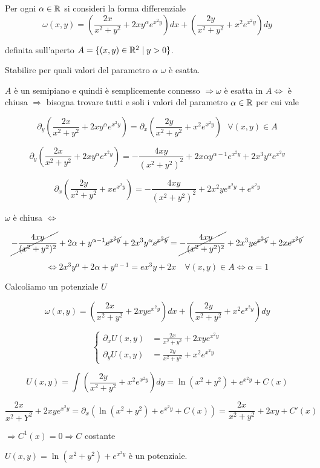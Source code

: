 	
\begin{exbar}
\begin{example}
	Per ogni $\alpha  \in \mathbb{R}$ si consideri la forma differenziale 
	\begin{equation*}
		\omega (x,y)=\left(\frac{2x}{x^2+y^2}+2xy^\alpha e^{x^2y} \right) dx + \left( \frac{2y}{x^2+y^2}+x^2e^{x^2y} \right) dy
	\end{equation*}
	
	definita sull'aperto $A= \{ (x,y)\in \mathbb{R}^2 \mid y >0\}$.
	
	Stabilire per quali valori del parametro $\alpha$ $\omega$ è esatta.
	
	$A$ è un semipiano e quindi è semplicemente connesso $\Rightarrow \omega$ è esatta in $A \Leftrightarrow $ è chiusa $\Rightarrow$ bisogna trovare tutti e soli i valori del parametro $\alpha \in \mathbb{R}$ per cui vale 
	
	$$\partial_y\left( \frac{2x}{x^2+y^2}+2xy^\alpha e^{x^2y} \right) = \partial_x\left( \frac{2y}{x^2+y^2}+x^2e^{x^2y} \right)\,\,\,\, \forall (x,y)\in A$$
	
	$$\partial_y\left( \frac{2x}{x^2+y^2} + 2xy^\alpha e^{x^2y} \right)=-\frac{4xy}{(x^2+y^2)^2}+2x\alpha y^{\alpha-1} e^{x^2y}+ 2x^3 y^\alpha e^{x^2y}$$
	
	$$\partial_x\left( \frac{2y}{x^2+y^2}+xe^{x^2y} \right)=-\frac{4xy}{(x^2+y^2)^2}+2x^2 y e^{x^2 y}+e^{x^2y}$$
	
	$\omega $ è chiusa $\Leftrightarrow $
	
	$$\cancel{-\frac{4xy}{(x^2+y^2)^2}} +2\alpha + y^{\alpha-1} \cancel{e^{x^2y}} +2x^3y^\alpha \cancel{e^{x^2y}} = \cancel{-\frac{4xy}{(x^2+y^2)^2}} +2x^3 y \cancel{e^{x^2y }} + 2x \cancel{e^{x^2y}}$$
	
	$$\Leftrightarrow 2x^3y^\alpha+ 2\alpha + y^{\alpha-1} = ex^3 y+ 2x \quad \forall (x,y)\in A \Leftrightarrow \alpha=1$$
	
	Calcoliamo un potenziale $U$
	
	$$\omega(x,y)= \left(\frac{2x}{x^2+y^2} +2xy e^{x^2y}\right)dx+ \left( \frac{2y}{x^2+y^2}+x^2e^{x^2y} \right)dy$$
	
	$$\begin{cases}
		\partial_xU(x,y)&=\frac{2x}{x^2+y^2}+2xy e^{x^2y} \\
		\partial_yU(x,y)&=\frac{2y}{x^2+y^2}+x^2e^{x^2y}
	\end{cases}$$
	
	$$U(x,y)=\int \left( \frac{2y}{x^2+y^2}+x^2e^{x^2y} \right)dy =\ln(x^2+y^2)+e^{x^2y}+C(x)$$
	
	$$\frac{2x}{x^2+Y^2}+2xy e^{x^2y}=\partial_x\left( \ln(x^2+y^2) +e^{x^2y}+C(x)\right)=\frac{2x}{x^2+y^2}+2xy + C'(x)$$
	
	$\Rightarrow C^1 (x)=0 \Rightarrow  C$ costante
	
	{\centering$U(x,y)=\ln (x^2+y^2) + e^{x^2y}$ è un potenziale. \par}
\end{example}
\end{exbar}